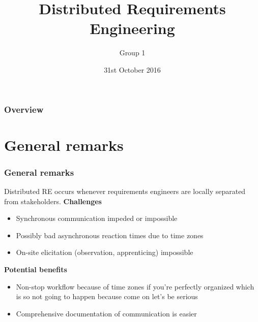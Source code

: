 \documentclass{beamer}
\title[Distributed RE]{Distributed Requirements Engineering} %
\author{Group 1}
\date{31st October 2016}
\begin{document}
\begin{frame}
\titlepage
\end{frame}

\begin{frame}
\frametitle{Overview} %
\tableofcontents %
\end{frame}


\section{General remarks}
\begin{frame}
\frametitle{General remarks}
Distributed RE occurs whenever requirements engineers are locally separated from stakeholders.
\vfill
\textbf{Challenges}
\begin{itemize}
\item Synchronous communication impeded or impossible
\item Possibly bad asynchronous reaction times due to time zones
\item On-site elicitation (observation, apprenticing) impossible
\end{itemize}

\textbf{Potential benefits}
\begin{itemize}
\item Non-stop workflow because of time zones if you're perfectly organized which is so not going to happen because come on let's be serious
\item Comprehensive documentation of communication is easier
\end{itemize}
\end{frame}

\end{document}
